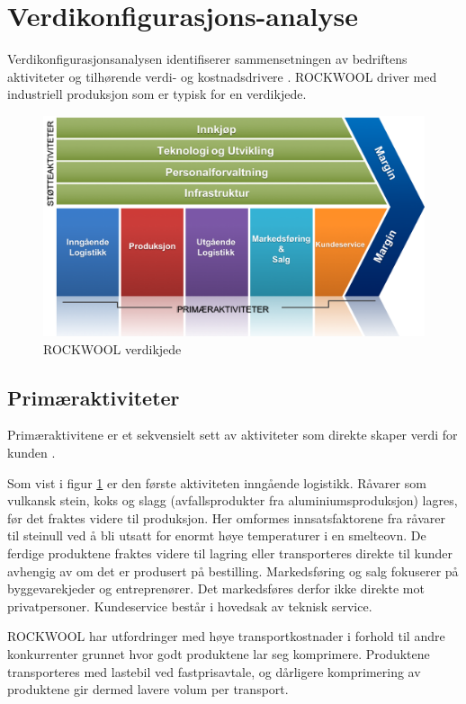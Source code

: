\section{Verdikonfigurasjons-analyse}
Verdikonfigurasjonsanalysen identifiserer sammensetningen av bedriftens aktiviteter og tilhørende verdi- og kostnadsdrivere \cite[s.~32]{FjeldstadogLunnan2018}. ROCKWOOL driver med industriell produksjon som er typisk for en verdikjede.

\begin{figure}[H]
\centering
\includegraphics [scale=0.5]{bilder/verdikjede.png}
\caption{ROCKWOOL verdikjede}
\label{fig:verdikjede}
\end{figure}

\subsection{Primæraktiviteter}
Primæraktivitene er et sekvensielt sett av aktiviteter som direkte skaper verdi for kunden \cite[s.~132]{FjeldstadogLunnan2018}. 
 
\indent \newline
Som vist i figur \ref{fig:verdikjede} er den første aktiviteten inngående logistikk. Råvarer som vulkansk stein, koks og slagg (avfallsprodukter fra aluminiumsproduksjon) lagres, før det fraktes videre til produksjon. Her omformes innsatsfaktorene fra råvarer til steinull ved å bli utsatt for enormt høye temperaturer i en smelteovn. De ferdige produktene fraktes videre til lagring eller transporteres direkte til kunder avhengig av om det er produsert på bestilling. Markedsføring og salg fokuserer på byggevarekjeder og entreprenører. Det markedsføres derfor ikke direkte mot privatpersoner. Kundeservice består i hovedsak av teknisk service.

\indent \newline
ROCKWOOL har utfordringer med høye transportkostnader i forhold til andre konkurrenter grunnet hvor godt produktene lar seg komprimere. Produktene transporteres med lastebil ved fastprisavtale, og dårligere komprimering av produktene gir dermed lavere volum per transport. 

